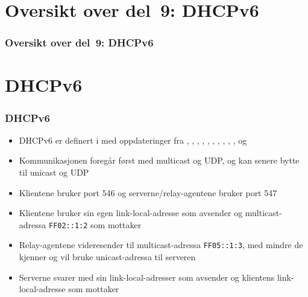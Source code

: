 \section*{Oversikt over del~9: DHCPv6}
\begin{frame}[allowframebreaks]
  \frametitle{Oversikt over del~9: DHCPv6}
    \tableofcontents%
\end{frame}

\section{DHCPv6}
\begin{frame}%
  \frametitle{DHCPv6}
  \pause
  \begin{itemize}[<+->]
  \item DHCPv6 er definert i  med oppdateringer fra
    , , , , ,
    , , , , ,
     og 
  \item Kommunikasjonen foregår først med multicast og UDP, og kan
    senere bytte til unicast og UDP
  \item Klientene bruker port 546 og serverne/relay-agentene bruker
    port 547
  \item Klientene bruker sin egen link-local-adresse som avsender og
    multicast-adressa \texttt{FF02::1:2} som mottaker
  \item Relay-agentene videresender til multicast-adressa
    \texttt{FF05::1:3}, med mindre de kjenner og vil bruke
    unicast-adressa til serveren
  \item Serverne svarer med sin link-local-adresser som avsender og
    klientens link-local-adresse som mottaker
  \end{itemize}
\end{frame}

